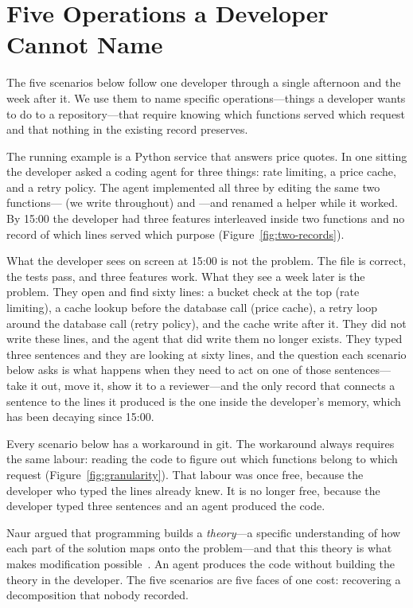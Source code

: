 \section{Five Operations a Developer Cannot Name}
\label{sec:scenarios}

The five scenarios below follow one developer through a single afternoon and
the week after it. We use them to name specific operations---things a developer
wants to do to a repository---that require knowing which functions served which
request and that nothing in the existing record preserves.

The running example is a Python service that answers price quotes.
In one sitting the developer asked a coding agent for three things: rate limiting,
a price cache, and a retry policy. The agent implemented all three by editing
the same two functions--- (we write 
throughout) and ---and
renamed a helper while it worked. By 15:00 the developer had three features
interleaved inside two functions and no record of which lines served which
purpose (Figure~\ref{fig:two-records}).

What the developer sees on screen at 15:00 is not the problem. The file is
correct, the tests pass, and three features work. What they see a week later is
the problem. They open  and find sixty lines: a bucket
check at the top (rate limiting), a cache lookup before the database call (price
cache), a retry loop around the database call (retry policy), and the cache
write after it. They did not write these lines, and the agent that did write them
no longer exists. They typed three sentences and they are looking at sixty lines,
and the question each scenario below asks is what happens when they need to act
on one of those sentences---take it out, move it, show it to a reviewer---and
the only record that connects a sentence to the lines it produced is the one
inside the developer's memory, which has been decaying since 15:00.

Every scenario below has a workaround in git. The workaround always requires the
same labour: reading the code to figure out which functions belong to which
request (Figure~\ref{fig:granularity}). That labour was once free, because the
developer who typed the lines already knew. It is no longer free, because the
developer typed three sentences and an agent produced the code.

Naur argued that programming builds a \emph{theory}---a specific understanding
of how each part of the solution maps onto the problem---and that this theory is
what makes modification possible~\cite{naur1985}. An agent produces the code
without building the theory in the developer. The five scenarios are five faces
of one cost: recovering a decomposition that nobody recorded.

